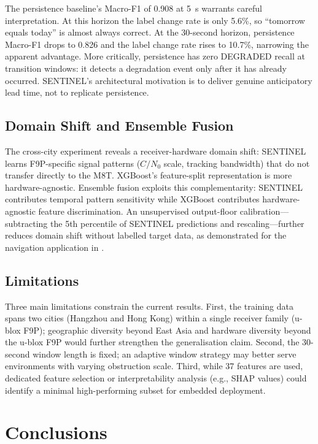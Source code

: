 \documentclass[pdflatex,sn-mathphys-num]{sn-jnl}
\begin{document}
The persistence baseline's Macro-F1 of 0.908 at 5~s warrants careful
interpretation.  At this horizon the label change rate is only 5.6\%, so
``tomorrow equals today'' is almost always correct.  At the 30-second horizon,
persistence Macro-F1 drops to 0.826 and the label change rate rises to 10.7\%,
narrowing the apparent advantage.  More critically, persistence has zero
DEGRADED recall at transition windows: it detects a degradation event only
after it has already occurred.  SENTINEL's architectural motivation is to
deliver genuine anticipatory lead time, not to replicate persistence.

\subsection{Domain Shift and Ensemble Fusion}

The cross-city experiment reveals a receiver-hardware domain shift: SENTINEL
learns F9P-specific signal patterns ($C/N_0$ scale, tracking bandwidth) that
do not transfer directly to the M8T.  XGBoost's feature-split representation
is more hardware-agnostic.  Ensemble fusion exploits this complementarity:
SENTINEL contributes temporal pattern sensitivity while XGBoost contributes
hardware-agnostic feature discrimination.  An unsupervised output-floor
calibration---subtracting the 5th percentile of SENTINEL predictions and
rescaling---further reduces domain shift without labelled target data, as
demonstrated for the navigation application in \cite{[AuthorYear_Paper_B_TITS]}.

\subsection{Limitations}

Three main limitations constrain the current results.  First, the training
data spans two cities (Hangzhou and Hong Kong) within a single receiver family
(u-blox F9P); geographic diversity beyond East Asia and hardware diversity
beyond the u-blox F9P would further strengthen the generalisation claim.  Second, the 30-second window length is fixed; an adaptive window
strategy may better serve environments with varying obstruction scale.
Third, while 37 features are used, dedicated feature selection or
interpretability analysis (e.g., SHAP values) could identify a minimal
high-performing subset for embedded deployment.

\section{Conclusions}\label{sec:conclusion}
\end{document}
